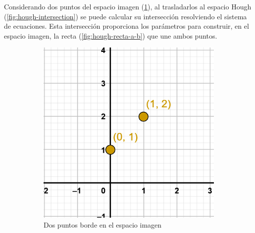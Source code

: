 Considerando dos puntos del espacio imagen (\ref{fig:hough-punto-imagen}), al trasladarlos al espacio Hough (\ref{fig:hough-intersection}) se puede calcular su intersección resolviendo el sistema de ecuaciones. Esta intersección proporciona los parámetros para construir, en el espacio imagen, la recta (\ref{fig:hough-recta-a-b}) que une ambos puntos.

\begin{figure}
    \centering
    \begin{subfigure}[b]{0.3\textwidth}
        \centering
        \includegraphics[width=\textwidth]{imaxes/c-bases-teoricas/hough-1}
        \caption{Dos puntos borde en el espacio imagen}
        \label{fig:hough-punto-imagen}
    \end{subfigure}
    \hfill
    \begin{subfigure}[b]{0.3\textwidth}
        \centering

\end{subfigure}
\end{figure}
